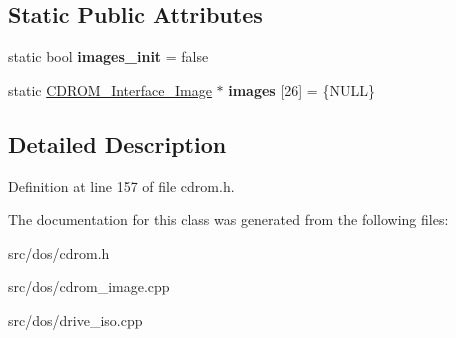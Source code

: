 \subsection*{Static Public Attributes}
\begin{DoxyCompactItemize}
\item 
\hypertarget{classCDROM__Interface__Image_a901be8d60520cf91bcabeb67a808c644}{static bool {\bfseries images\-\_\-init} = false}\label{classCDROM__Interface__Image_a901be8d60520cf91bcabeb67a808c644}

\item 
\hypertarget{classCDROM__Interface__Image_a547a33f528bf5f50063af1def199a7a3}{static \hyperlink{classCDROM__Interface__Image}{C\-D\-R\-O\-M\-\_\-\-Interface\-\_\-\-Image} $\ast$ {\bfseries images} \mbox{[}26\mbox{]} = \{N\-U\-L\-L\}}\label{classCDROM__Interface__Image_a547a33f528bf5f50063af1def199a7a3}

\end{DoxyCompactItemize}


\subsection{Detailed Description}


Definition at line 157 of file cdrom.\-h.



The documentation for this class was generated from the following files\-:\begin{DoxyCompactItemize}
\item 
src/dos/cdrom.\-h\item 
src/dos/cdrom\-\_\-image.\-cpp\item 
src/dos/drive\-\_\-iso.\-cpp\end{DoxyCompactItemize}
